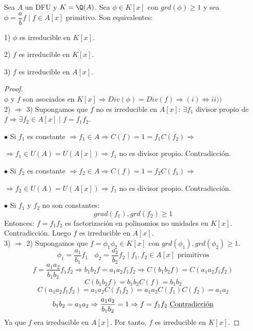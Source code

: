 \begin{teo}
    \label{teoEqIrreducibles}
    Sea $A$ un DFU y $K=\Q(A)$. Sea $\phi \in K[x]$ con $grd(\phi)\geq 1$ y sea $\phi=\dfrac{a}{b}f \mid f \in A[x]$
    primitivo. Son equivalentes:\par
    1) $\phi$ es irreducible en $K[x]$.\par
    2) $f$ es irreducible en $K[x]$.\par
    3) $f$ es irreducible en $A[x]$.
\begin{proof}
    \ \\
    $\phi$ y $f$ son asociados en $K[x] \Rightarrow Div(\phi)=Div(f) \Rightarrow (i) \Leftrightarrow ii))$\\

    
    2) $\Rightarrow$ 3) Supongamos que $f$ no es irreducible en $A[x]$:\newline
    $\exists f_1$ divisor propio de $f \Rightarrow \exists f_2 \in A[x] \mid f = f_1f_2$.\par
    $\bullet$ Si $f_1$ es constante $\Rightarrow f_1 \in A \Rightarrow C(f) = 1 = f_1C(f_2) \Rightarrow$
    \par $\Rightarrow f_1 \in U(A)=U(A[x]) \Rightarrow f_1$ no es divisor propio. Contradicción.\par
    $\bullet$ Si $f_2$ es constante $\Rightarrow f_2 \in A \Rightarrow C(f) = 1 = f_2C(f_1) \Rightarrow$
    \par $\Rightarrow f_2 \in U(A)=U(A[x])\Rightarrow f_1$ no es divisor propio. Contradicción.\par
    $\bullet$ Si $f_1$ y $f_2$ no son constantes:
    $$grad(f_1),grd(f_2)\geq 1$$
    Entonces:
    $f=f_1f_2$ es factorización en polinomios no unidades en $K[x]$. Contradicción.\newline
    Luego $f$ es irreducible en $A[x]$.\\

    
    3) $\Rightarrow$ 2) Supongamos que $f=\phi_1\phi_2\in K[x]$ con $grd(\phi_1),grd(\phi_2)\geq 1$.
    $$\phi_1 = \dfrac{a_1}{b_1}f_1~~~~\phi_2=\dfrac{a_2}{b_2}f_2 \mid f_1,f_2 \in A[x] \mbox{ primitivos}$$
    $$f=\dfrac{a_1a_2}{b_1b_2}f_1f_2 \Rightarrow b_1b_2f=a_1a_2f_1f_2 \Rightarrow C(b_1b_2f)=C(a_1a_2f_1f_2)$$
    $$C(b_1b_2f) = b_1b_2C(f) = b_1b_2$$
    $$C(a_1a_2f_1f_2)=a_1a_2C(f_1f_2)=a_1a_2C(f_1)C(f_2)=a_1a_2$$
    $$b_1b_2=a_1a_2 \Rightarrow \dfrac{a_1a_2}{b_1b_2}=1 \Rightarrow f=f_1f_2 \mbox{ \underline{Contradicción}}$$
    Ya que $f$ era irreducible en $A[x]$.\newline
    Por tanto, $f$ es irreducible en $K[x]$.
\end{proof}
\end{teo}

